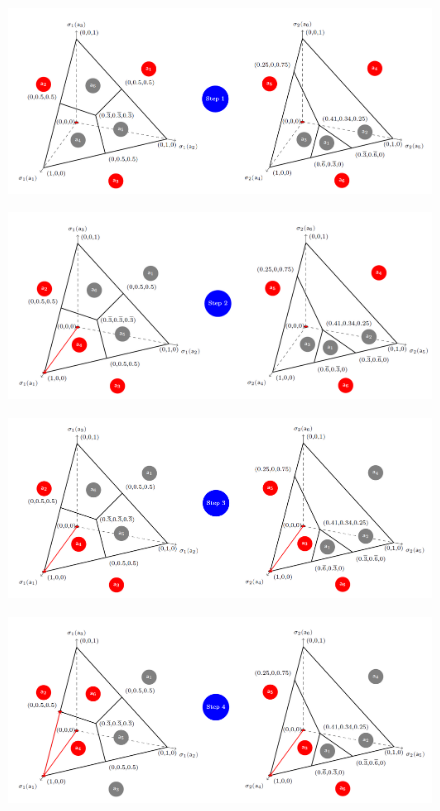 \begin{figure}[H]
\centering
\includegraphics[width=\textwidth]{images/img_2_13_04.png}
\end{figure}
\begin{figure}[H]
\centering
\includegraphics[width=\textwidth]{images/img_2_13_05.png}
\end{figure}
\begin{figure}[H]
\centering
\includegraphics[width=\textwidth]{images/img_2_13_06.png}
\end{figure}
\begin{figure}[H]
\centering
\includegraphics[width=\textwidth]{images/img_2_13_07.png}
\end{figure}
